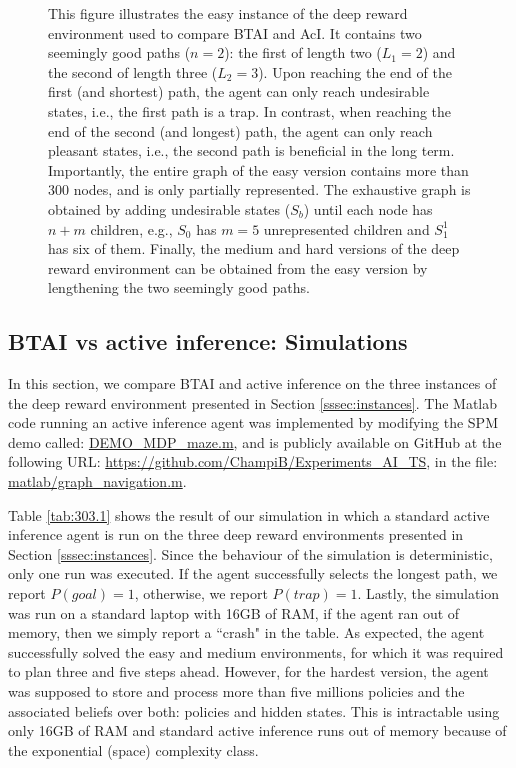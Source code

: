 \documentclass[twoside,11pt]{article}
\begin{document}
{\begin{figure}[H]
\begin{center}
\begin{tikzpicture}[square/.style={regular polygon,regular polygon sides=4}]
    \end{tikzpicture}
 	\end{center}
\vspace{-0.25cm}
    \caption{
This figure illustrates the easy instance of the deep reward environment used to compare BTAI and AcI. It contains two seemingly good paths ($n=2$): the first of length two ($L_1=2$) and the second of length three ($L_2=3$). Upon reaching the end of the first (and shortest) path, the agent can only reach undesirable states, i.e., the first path is a trap. In contrast, when reaching the end of the second (and longest) path, the agent can only reach pleasant states, i.e., the second path is beneficial in the long term. Importantly, the entire graph of the easy version contains more than 300 nodes, and is only partially represented. The exhaustive graph is obtained by adding undesirable states ($S_b$) until each node has $n + m$ children, e.g., $S_0$ has $m=5$ unrepresented children and $S_1^1$ has six of them. Finally, the medium and hard versions of the deep reward environment can be obtained from the easy version by lengthening the two seemingly good paths.}
    \label{fig:easy_medium_hard_envs}
\end{figure}
}

\subsection{BTAI vs active inference: Simulations} \label{ssec:BTAI_vs_AI_simul}

In this section, we compare BTAI and active inference on the three instances of the deep reward environment presented in Section \ref{sssec:instances}. The Matlab code running an active inference agent was implemented by modifying the SPM demo called: \url{DEMO_MDP_maze.m}, and is publicly available on GitHub at the following URL: \url{https://github.com/ChampiB/Experiments_AI_TS}, in the file: \url{matlab/graph_navigation.m}.

Table \ref{tab:303.1} shows the result of our simulation in which a standard active inference agent is run on the three deep reward environments presented in Section \ref{sssec:instances}. Since the behaviour of the simulation is deterministic, only one run was executed. If the agent successfully selects the longest path, we report $P(goal) = 1$, otherwise, we report $P(trap) = 1$. Lastly, the simulation was run on a standard laptop with 16GB of RAM, if the agent ran out of memory, then we simply report a ``crash" in the table. As expected, the agent successfully solved the easy and medium environments, for which it was required to plan three and five steps ahead. However, for the hardest version, the agent was supposed to store and process more than five millions policies and the associated beliefs over both: policies and hidden states. This is intractable using only 16GB of RAM and standard active inference runs out of memory because of the exponential (space) complexity class.
\end{document}
